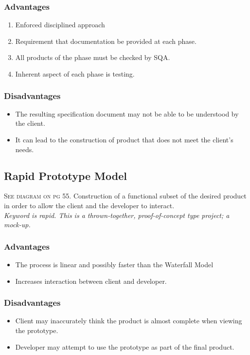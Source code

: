 \documentclass{report}
\begin{document}
			\subsubsection{Advantages}
				\begin{enumerate}
					\item Enforced disciplined approach
					\item Requirement that documentation be provided at each phase.
					\item All products of the phase must be checked by SQA.
					\item Inherent aspect of each phase is testing.
				\end{enumerate}
			\subsubsection{Disadvantages}
				\begin{itemize}
					\item The resulting specification document may not be able to be understood by the client.
					\item It can lead to the construction of product that does not meet the client's needs.					
				\end{itemize}
		\subsection{Rapid Prototype Model}
			\textsc{See diagram on pg 55.}
			Construction of a functional subset of the desired product in order to allow the client and the developer to interact.\\
			\textit{Keyword is rapid.  This is a thrown-together, proof-of-concept type project; a mock-up.}
			\subsubsection{Advantages}
				\begin{itemize}
					\item The process is linear and possibly faster than the Waterfall Model
					\item Increases interaction between client and developer.
				\end{itemize}
			\subsubsection{Disadvantages}
				\begin{itemize}
					\item Client may inaccurately think the product is almost complete when viewing the prototype.
					\item Developer may attempt to use the prototype as part of the final product.
				\end{itemize}
\end{document}
